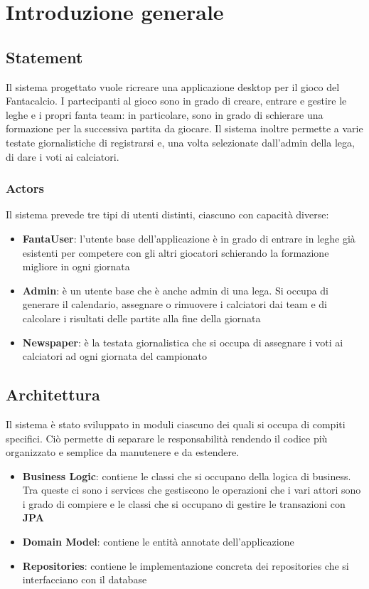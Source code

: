 \section{Introduzione generale}

\subsection{Statement}
Il sistema progettato vuole ricreare una applicazione desktop per il gioco del
Fantacalcio. I partecipanti al gioco sono in grado di creare, entrare e gestire le leghe e i 
propri fanta team: in particolare, sono in grado di schierare una formazione per la successiva partita
da giocare. Il sistema inoltre permette a varie testate giornalistiche di registrarsi e, 
una volta selezionate dall'admin della lega, di dare i voti ai calciatori.
\subsubsection{Actors}
Il sistema prevede tre tipi di utenti distinti, ciascuno con capacità diverse:
\begin{itemize}
    \item \textbf{FantaUser}: l'utente base dell'applicazione è in grado di entrare in leghe già esistenti per
    competere con gli altri giocatori schierando la formazione migliore in ogni giornata
    \item \textbf{Admin}: è un utente base che è anche admin di una lega. Si occupa di generare il calendario,  
    assegnare o rimuovere i calciatori dai team e di calcolare i risultati delle partite alla fine della giornata
    \item \textbf{Newspaper}: è la testata giornalistica che si occupa di assegnare i voti ai calciatori ad ogni giornata del campionato
\end{itemize}

\subsection{Architettura}
Il sistema è stato sviluppato in moduli ciascuno dei quali si occupa di compiti specifici.
Ciò permette di separare le responsabilità rendendo il codice più organizzato e semplice 
da manutenere e da estendere.
\begin{itemize}
    \item \textbf{Business Logic}: contiene le classi che si occupano della logica di 
    business. Tra queste ci sono i services che gestiscono le operazioni che i vari 
    attori sono i grado di compiere e le classi che si occupano di gestire le transazioni con \textbf{JPA}
    \item \textbf{Domain Model}: contiene le entità annotate dell'applicazione
    \item \textbf{Repositories}: contiene le implementazione concreta dei repositories che si interfacciano con il database
\end{itemize}

